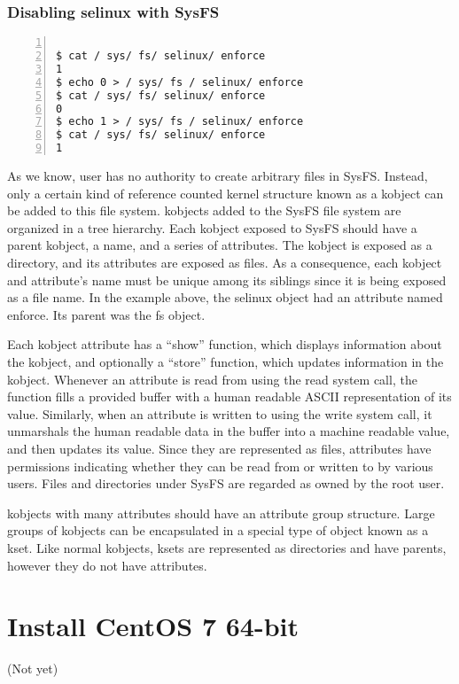 \documentclass[10pt,draftclsnofoot,journal,compsoc,onecolumn]{IEEEtran}
\begin{document}
\subsubsection{Disabling selinux with SysFS}
\begin{lstlisting}[numbers=left]

$ cat / sys/ fs/ selinux/ enforce
1
$ echo 0 > / sys/ fs / selinux/ enforce
$ cat / sys/ fs/ selinux/ enforce
0
$ echo 1 > / sys/ fs / selinux/ enforce
$ cat / sys/ fs/ selinux/ enforce
1
\end{lstlisting}

\par As we know, user has no authority to create arbitrary files in SysFS. Instead, only a certain kind of reference counted kernel structure known as a kobject can be added to this file system. kobjects added to the SysFS file system are organized in a tree hierarchy. Each kobject exposed to SysFS should have a parent kobject, a name, and a series of attributes. The kobject is exposed as a directory, and its attributes are exposed as files. As a consequence, each kobject and attribute’s name must be unique among its siblings since it is being exposed as a file name. In the example above, the selinux object had an attribute named enforce. Its parent was the fs object.

\par Each kobject attribute has a “show” function, which displays information about the kobject, and optionally a “store” function, which updates information in the kobject. Whenever an attribute is read from using the read system call, the function fills a provided buffer with a human readable ASCII representation of its value. Similarly, when an attribute is written to using the write system call, it unmarshals the human readable data in the buffer into a machine readable value, and then updates its value. Since they are represented as files, attributes have permissions indicating whether they can be read from or written to by various users. Files and directories under SysFS are regarded as owned by the root user.

\par kobjects with many attributes should have an attribute group structure. Large groups of kobjects can be encapsulated in a special type of object known as a kset. Like normal kobjects, ksets are represented as directories and have parents, however they do not have attributes.

\section{Install CentOS 7 64-bit}
    (Not yet)
\end{document}
